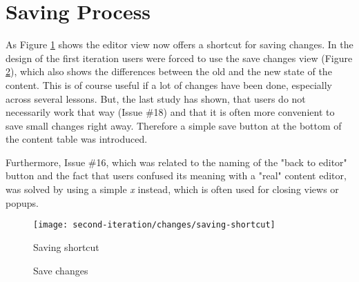 \section{Saving Process}
As Figure \ref{fig:saving-shortcut} shows the editor view now offers a shortcut for saving changes. In the design of the first iteration users were forced to use the save changes view (Figure \ref{fig:save-changes}), which also shows the differences between the old and the new state of the content. This is of course useful if a lot of changes have been done, especially across several lessons. But, the last study has shown, that users do not necessarily work that way (Issue \#18) and that it is often more convenient to save small changes right away. Therefore a simple save button at the bottom of the content table was introduced.

Furthermore, Issue \#16, which was related to the naming of the "back to editor" button and the fact that users confused its meaning with a "real" content editor, was solved by using a simple \emph{x} instead, which is often used for closing views or popups.

\begin{figure}[h!]
 \centering
 \texttt{[image: second-iteration/changes/saving-shortcut]}
 \caption{Saving shortcut}
 \label{fig:saving-shortcut}
\end{figure}

\begin{figure}[hp!]
 \centering
 \caption{Save changes}
 \label{fig:save-changes}
\end{figure}

